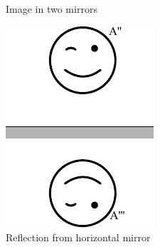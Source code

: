 \documentclass[11pt]{article}
\begin{document}
{\begin{figure}[h]
	\caption{Image in two mirrors}
\end{figure}
\begin{figure}[h]
	\centerline{\includegraphics[scale=1.1]{2016-v3g-08-nurgapeegel_j3}}
	\caption{Reflection from horizontal mirror}
\end{figure}
\fi
}
\end{document}
